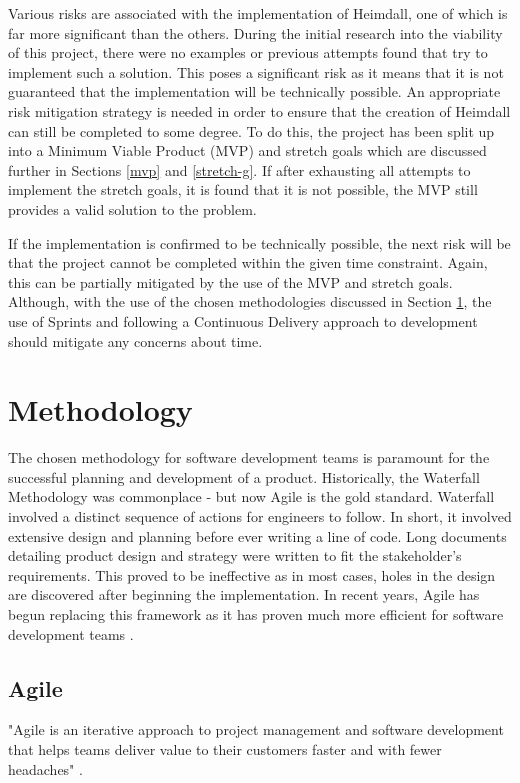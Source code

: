 \documentclass{article}
\begin{document}
Various risks are associated with the implementation of Heimdall, one of which is far more significant than the others. During the initial research into the viability of this project, there were no examples or previous attempts found that try to implement such a solution. This poses a significant risk as it means that it is not guaranteed that the implementation will be technically possible. An appropriate risk mitigation strategy is needed in order to ensure that the creation of Heimdall can still be completed to some degree. To do this, the project has been split up into a Minimum Viable Product (MVP) and stretch goals which are discussed further in Sections \ref{mvp} and \ref{stretch-g}. If after exhausting all attempts to implement the stretch goals, it is found that it is not possible, the MVP still provides a valid solution to the problem. \\\par If the implementation is confirmed to be technically possible, the next risk will be that the project cannot be completed within the given time constraint. Again, this can be partially mitigated by the use of the MVP and stretch goals. Although, with the use of the chosen methodologies discussed in Section \ref{methodology}, the use of Sprints and following a Continuous Delivery approach to development should mitigate any concerns about time.


 
\section{Methodology} \label{methodology}
The chosen methodology for software development teams is paramount for the successful planning and development of a product. Historically, the Waterfall Methodology was commonplace - but now Agile is the gold standard. Waterfall involved a distinct sequence of actions for engineers to follow. In short, it involved extensive design and planning before ever writing a line of code. Long documents detailing product design and strategy were written to fit the stakeholder's requirements. This proved to be ineffective as in most cases, holes in the design are discovered after beginning the implementation. In recent years, Agile has begun replacing this framework as it has proven much more efficient for software development teams \cite{agile-waterfall}.



\subsection{Agile}
"Agile is an iterative approach to project management and software development that helps teams deliver value to their customers faster and with fewer headaches" \cite{what-is-agile}. 
\end{document}
